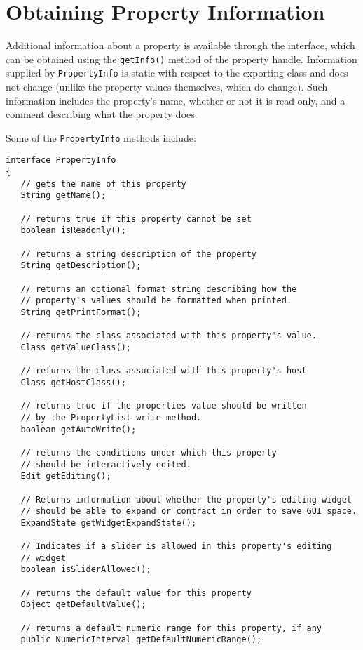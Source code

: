 \label{propertyInfoSec}
\section{Obtaining Property Information}

Additional information about a property is available through the
interface, which can be obtained using the
{\tt getInfo()} method of the property handle.  Information supplied by
{\tt PropertyInfo} is static with respect to the exporting class and
does not change (unlike the property values themselves, which do
change). Such information includes the property's name, whether or not
it is read-only, and a comment describing what the property does.

Some of the {\tt PropertyInfo} methods include:
\begin{lstlisting}[]
interface PropertyInfo
{
   // gets the name of this property
   String getName(); 

   // returns true if this property cannot be set
   boolean isReadonly();

   // returns a string description of the property
   String getDescription();

   // returns an optional format string describing how the 
   // property's values should be formatted when printed.
   String getPrintFormat();
 
   // returns the class associated with this property's value.
   Class getValueClass();

   // returns the class associated with this property's host
   Class getHostClass();

   // returns true if the properties value should be written
   // by the PropertyList write method.
   boolean getAutoWrite();

   // returns the conditions under which this property 
   // should be interactively edited.
   Edit getEditing();

   // Returns information about whether the property's editing widget
   // should be able to expand or contract in order to save GUI space. 
   ExpandState getWidgetExpandState();

   // Indicates if a slider is allowed in this property's editing
   // widget
   boolean isSliderAllowed();

   // returns the default value for this property
   Object getDefaultValue();

   // returns a default numeric range for this property, if any
   public NumericInterval getDefaultNumericRange();


\end{lstlisting}
